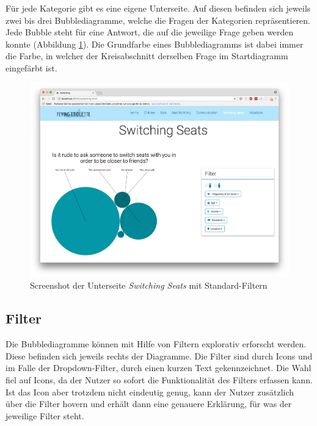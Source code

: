 \documentclass{mi-seminar}
\begin{document}
Für jede Kategorie gibt es eine eigene Unterseite. Auf diesen befinden sich jeweils zwei bis drei Bubblediagramme, welche die Fragen der Kategorien repräsentieren. Jede Bubble steht für eine Antwort, die auf die jeweilige Frage geben werden konnte (Abbildung \ref{ScSwitchingSeats}). 
Die Grundfarbe eines Bubblediagramms ist dabei immer die Farbe, in welcher der Kreisabschnitt derselben Frage im Startdiagramm eingefärbt ist.
\begin{figure}
\includegraphics[scale=0.5]{assets/filter_standard.png}
\caption{Screenshot der Unterseite \textit{Switching Seats} mit Standard-Filtern}
\label{ScSwitchingSeats}
\end{figure}

\subsection{Filter}
Die Bubblediagramme können mit Hilfe von Filtern explorativ erforscht werden. Diese befinden sich jeweils rechts der Diagramme. Die Filter sind durch Icons und im Falle der Dropdown-Filter, durch einen kurzen Text gekennzeichnet. Die Wahl fiel auf Icons, da der Nutzer so sofort die Funktionalität des Filters erfassen kann. Ist das Icon aber trotzdem nicht eindeutig genug, kann der Nutzer zusätzlich über die Filter hovern und erhält dann eine genauere Erklärung, für was der jeweilige Filter steht. 
\end{document}
